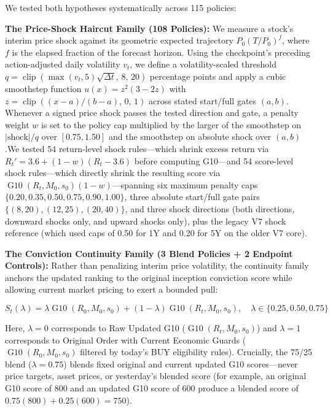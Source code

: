 \documentclass[11pt,a4paper]{article}
\numberwithin{table}{section}
\begin{document}
We tested both hypotheses systematically across 115 policies:

\textbf{The Price-Shock Haircut Family (108 Policies):} We measure a stock's interim price shock against its geometric expected trajectory $P_0(T/P_0)^f$, where $f$ is the elapsed fraction of the forecast horizon. Using the checkpoint's preceding action-adjusted daily volatility $v_t$, we define a volatility-scaled threshold $q = \operatorname{clip}(\max(v_t, 5)\sqrt{\Delta t},\, 8,\, 20)$ percentage points and apply a cubic smoothstep function $u(x) = z^2(3 - 2z)$ with $z = \operatorname{clip}((x - a)/(b - a),\, 0,\, 1)$ across stated start/full gates $(a, b)$. Whenever a signed price shock passes the tested direction and gate, a penalty weight $w$ is set to the policy cap multiplied by the larger of the smoothstep on $|\text{shock}|/q$ over $[0.75, 1.50]$ and the smoothstep on absolute shock over $(a, b)$.We tested 54 return-level shock rules---which shrink excess return via $R_t' = 3.6 + (1 - w)(R_t - 3.6)$ before computing G10---and 54 score-level shock rules---which directly shrink the resulting score via $\operatorname{G10}(R_t, M_0, s_0)(1 - w)$---spanning six maximum penalty caps $\{0.20, 0.35, 0.50, 0.75, 0.90, 1.00\}$, three absolute start/full gate pairs $\{(8, 20), (12, 25), (20, 40)\}$, and three shock directions (both directions, downward shocks only, and upward shocks only), plus the legacy V7 shock reference (which used caps of 0.50 for 1Y and 0.20 for 5Y on the older V7 core).

\textbf{The Conviction Continuity Family (3 Blend Policies + 2 Endpoint Controls):} Rather than penalizing interim price volatility, the continuity family anchors the updated ranking to the original inception conviction score while allowing current market pricing to exert a bounded pull:

\begin{equation}S_t(\lambda) = \lambda\operatorname{G10}(R_0, M_0, s_0) + (1 - \lambda)\operatorname{G10}(R_t, M_0, s_0), \quad \lambda \in \{0.25, 0.50, 0.75\} \end{equation}

Here, $\lambda = 0$ corresponds to Raw Updated G10 ($\operatorname{G10}(R_t, M_0, s_0)$) and $\lambda = 1$ corresponds to Original Order with Current Economic Guards ($\operatorname{G10}(R_0, M_0, s_0)$ filtered by today's BUY eligibility rules). Crucially, the 75/25 blend ($\lambda = 0.75$) blends fixed original and current updated G10 scores---never price targets, asset prices, or yesterday's blended score (for example, an original G10 score of 800 and an updated G10 score of 600 produce a blended score of $0.75(800) + 0.25(600) = 750$).
\end{document}
